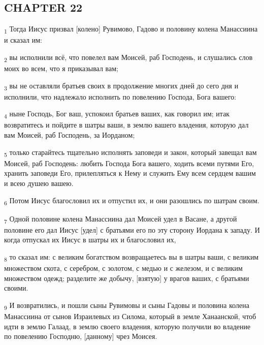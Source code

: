 \subsection{CHAPTER 22}
\begin{tcolorbox}
\textsubscript{1} Тогда Иисус призвал [колено] Рувимово, Гадово и половину колена Манассиина и сказал им:
\end{tcolorbox}
\begin{tcolorbox}
\textsubscript{2} вы исполнили всё, что повелел вам Моисей, раб Господень, и слушались слов моих во всем, что я приказывал вам;
\end{tcolorbox}
\begin{tcolorbox}
\textsubscript{3} вы не оставляли братьев своих в продолжение многих дней до сего дня и исполнили, что надлежало исполнить по повелению Господа, Бога вашего:
\end{tcolorbox}
\begin{tcolorbox}
\textsubscript{4} ныне Господь, Бог ваш, успокоил братьев ваших, как говорил им; итак возвратитесь и пойдите в шатры ваши, в землю вашего владения, которую дал вам Моисей, раб Господень, за Иорданом;
\end{tcolorbox}
\begin{tcolorbox}
\textsubscript{5} только старайтесь тщательно исполнять заповеди и закон, который завещал вам Моисей, раб Господень: любить Господа Бога вашего, ходить всеми путями Его, хранить заповеди Его, прилепляться к Нему и служить Ему всем сердцем вашим и всею душею вашею.
\end{tcolorbox}
\begin{tcolorbox}
\textsubscript{6} Потом Иисус благословил их и отпустил их, и они разошлись по шатрам своим.
\end{tcolorbox}
\begin{tcolorbox}
\textsubscript{7} Одной половине колена Манассиина дал Моисей удел в Васане, а другой половине его дал Иисус [удел] с братьями его по эту сторону Иордана к западу. И когда отпускал их Иисус в шатры их и благословил их,
\end{tcolorbox}
\begin{tcolorbox}
\textsubscript{8} то сказал им: с великим богатством возвращаетесь вы в шатры ваши, с великим множеством скота, с серебром, с золотом, с медью и с железом, и с великим множеством одежд; разделите же добычу, [взятую] у врагов ваших, с братьями своими.
\end{tcolorbox}
\begin{tcolorbox}
\textsubscript{9} И возвратились, и пошли сыны Рувимовы и сыны Гадовы и половина колена Манассиина от сынов Израилевых из Силома, который в земле Ханаанской, чтоб идти в землю Галаад, в землю своего владения, которую получили во владение по повелению Господню, [данному] чрез Моисея.
\end{tcolorbox}
